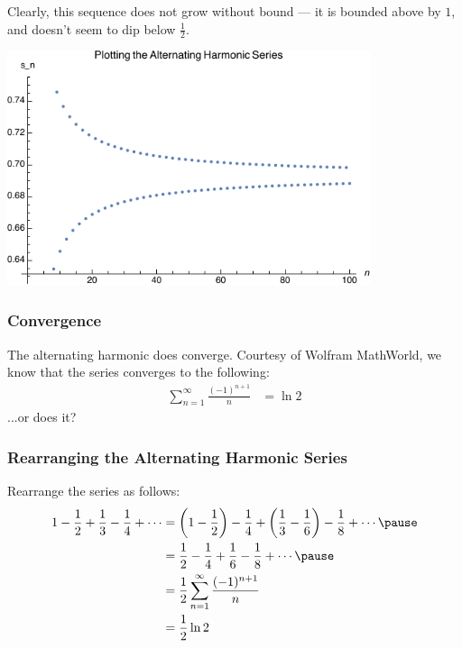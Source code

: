 \documentclass{beamer}
\begin{document}
\begin{frame}
  Clearly, this sequence does not grow without bound --- it is bounded above by $1$, and doesn't seem to dip below $\frac{1}{2}$.
  \begin{center}
    \includegraphics[width=0.8\textwidth]{images/alternating_harmonic_series_plot.pdf}
  \end{center}
\end{frame}
\begin{frame}
  \frametitle{Convergence}
  The alternating harmonic does converge. Courtesy of Wolfram MathWorld, we know that the series converges to the following:
  \begin{align*}
    \sum_{n=1}^{\infty}\frac{(-1)^{n+1}}{n} &= \ln 2
  \end{align*}\pause
  ...or does it? 
\end{frame}
\begin{frame}
  \frametitle{Rearranging the Alternating Harmonic Series}
  Rearrange the series as follows:
  \begin{align*}
    1 - \frac{1}{2} + \frac{1}{3} - \frac{1}{4} + \cdots &= \left(1-\frac{1}{2}\right) - \frac{1}{4} + \left(\frac{1}{3} - \frac{1}{6}\right) - \frac{1}{8} + \cdots\pause\\
                                                                       &= \frac{1}{2} - \frac{1}{4} + \frac{1}{6} - \frac{1}{8} + \cdots\pause\\
                                                                       &= \frac{1}{2}\sum_{n=1}^{\infty}\frac{(-1)^{n+1}}{n}\\
                                                                       &= \frac{1}{2}\ln 2
  \end{align*}
\end{frame}
\end{document}
